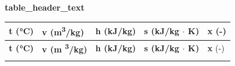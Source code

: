\begin{center}
    \textbf{ {{ table_header_text }} }
\end{center}
\vspace{0.2cm} %

\begin{longtable}{|>{\raggedleft\arraybackslash}p{3cm}|>{\raggedleft\arraybackslash}p{3cm}|>{\raggedleft\arraybackslash}p{3cm}|>{\raggedleft\arraybackslash}p{3cm}|>{\raggedleft\arraybackslash}p{2cm}|}
\hline
\textbf{t (°C)} & \textbf{v (m\textsuperscript{3}/kg)} & \textbf{h (kJ/kg)} & \textbf{s (kJ/kg $\cdot$ K)} & \textbf{x} (-) \\
\hline
\endfirsthead

\hline
\textbf{t (°C)} & \textbf{v (m \textsuperscript{3}/kg)} & \textbf{h (kJ/kg)} & \textbf{s (kJ/kg $\cdot$ K)} & \textbf{x} (-) \\
\hline
\endhead

\hline
\endfoot

\hline
\endlastfoot

{%
{%
{{ item }}{%
{%
{%
{%

\end{longtable}
